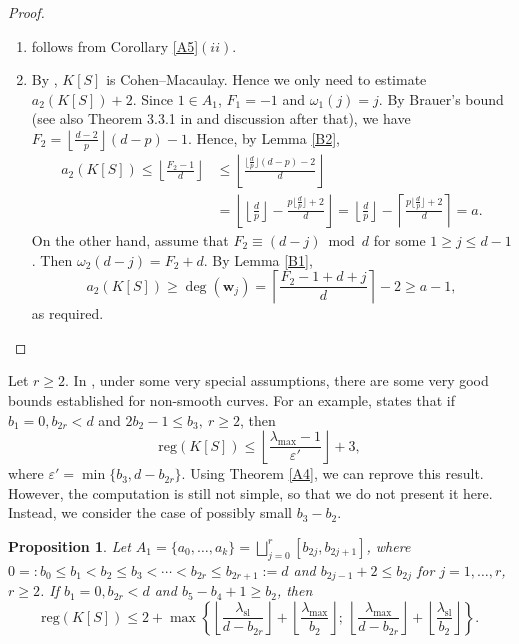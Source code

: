 \documentclass[11pt]{article}
\newtheorem{Proposition}[Theorem]{Proposition}
\def\deg{\operatorname{deg}}
\def\reg{\mathrm{reg}}
\def\wbf{{\mathbf w}}
\theoremstyle{remark}
\theoremstyle{definition}
\begin{document}
\begin{proof} 
\begin{enumerate}[\((i)\)]
    \item follows from Corollary \ref{A5}\((ii)\).
    \item By \cite[Corollary 3.4]{T}, $K[S]$ is Cohen--Macaulay. Hence we only need to estimate $a_2(K[S]) + 2$. Since $1\in A_1$, $F_1 = -1$ and $\omega_1(j) = j$. By Brauer's bound \cite[Theorem 7]{Bra} (see also Theorem 3.3.1 in \cite{Ra} and discussion after that), we have
$F_2 = \left\lfloor \frac{d-2}{p} \right\rfloor (d-p) -1$. Hence, by Lemma \ref{B2}, 
\begin{align*}
    a_2(K[S]) \leq  \left\lfloor \frac{F_2-1}{d} \right\rfloor &\leq \left\lfloor \frac{ \lfloor \frac{d}{p}\rfloor (d-p) -2}{d} \right\rfloor \\
&= \left\lfloor \left\lfloor \frac{d}{p} \right\rfloor -  \frac{p \lfloor \frac{d}{p}\rfloor + 2}{d} \right\rfloor =  \left\lfloor \frac{d}{p} \right\rfloor - \left\lceil \frac{p \lfloor \frac{d}{p}\rfloor + 2}{d} \right\rceil = a.
\end{align*}
On the other hand, assume that $F_2 \equiv (d-j)\bmod d$ for some $1 \geq j \leq d-1$. Then $\omega_2(d-j) = F_2 + d$. By Lemma \ref{B1},
$$a_2(K[S]) \geq \deg(\wbf_j) = \left\lceil \frac{F_2 - 1 + d+j}{d} \right\rceil - 2 \geq a-1,$$
as required.
\end{enumerate}
\end{proof}

Let $r\geq 2$. In \cite[Section 3]{LT}, under some very special assumptions, there are some very good bounds established for non-smooth curves. For an example, \cite[Theorem 3.4]{LT} states that if $b_1 = 0, b_{2r} < d$ and $2b_2 - 1 \leq b_3,\ r\geq 2$, then
$$\reg(K[S]) \leq \left\lfloor \frac{\lambda_{\max} - 1}{\varepsilon'} \right\rfloor + 3,$$
where $\varepsilon' = \min\{b_3, d- b_{2r} \}$. Using Theorem  \ref{A4}, we can reprove this result. However, the computation is still not  simple, so that we do not present it here. Instead, we consider the case of possibly small $b_3 - b_2$.

\begin{Proposition} \label{Bd2} Let $A_1 = \{a_0,\ldots,a_k\} = \bigsqcup_{j=0}^r [b_{2j},b_{2j+1}]$, where $0=:b_0 \leq b_1 < b_2 \leq b_3 < \cdots < b_{2r}\leq b_{2r+1} := d$ and $b_{2j-1} + 2 \leq b_{2j}$ for $j=1,\ldots,r$, $r\ge 2$.  If $b_1 = 0, b_{2r} < d$ and $b_5 - b_4 + 1\geq b_2$, then
$$\reg(K[S]) \leq 2+ \max\left\{ \left\lfloor \frac{ \lambda_{\mathrm{sl}}}{d-b_{2r}} \right\rfloor + \left\lfloor \frac{\lambda_{\max}}{b_2} \right\rfloor;\ \left\lfloor \frac{ \lambda_{\max}}{d-b_{2r}} \right\rfloor + \left\lfloor \frac{\lambda_{\mathrm{sl}}}{b_2} \right\rfloor \right\}.$$
\end{Proposition} 
\end{document}
